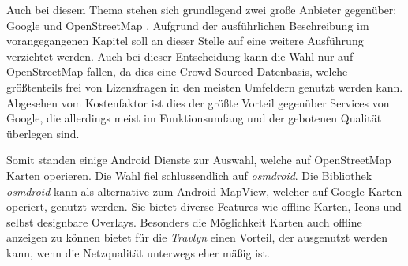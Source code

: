 Auch bei diesem Thema stehen sich grundlegend zwei große Anbieter gegenüber: Google \cite{Google.01.02.2020} und OpenStreetMap \cite{OpenStreetMap.}. Aufgrund der ausführlichen Beschreibung im vorangegangenen Kapitel soll an dieser Stelle auf eine weitere Ausführung verzichtet werden. Auch bei dieser Entscheidung kann die Wahl nur auf OpenStreetMap fallen, da dies eine Crowd Sourced Datenbasis, welche größtenteils frei von Lizenzfragen in den meisten Umfeldern genutzt werden kann. Abgesehen vom Kostenfaktor ist dies der größte Vorteil gegenüber Services von Google, die allerdings meist im Funktionsumfang und der gebotenen Qualität überlegen sind.

\vspace{0.25cm}

Somit standen einige Android Dienste zur Auswahl, welche auf OpenStreetMap Karten operieren. Die Wahl fiel schlussendlich auf \textit{osmdroid}\cite{osmdroid.3162020}. Die Bibliothek \textit{osmdroid} kann als alternative zum Android MapView, welcher auf Google Karten operiert, genutzt werden. Sie bietet diverse Features wie offline Karten, Icons und selbst designbare Overlays. Besonders die Möglichkeit Karten auch offline anzeigen zu können bietet für die \textit{Travlyn} einen Vorteil, der ausgenutzt werden kann, wenn die Netzqualität unterwegs eher mäßig ist. 